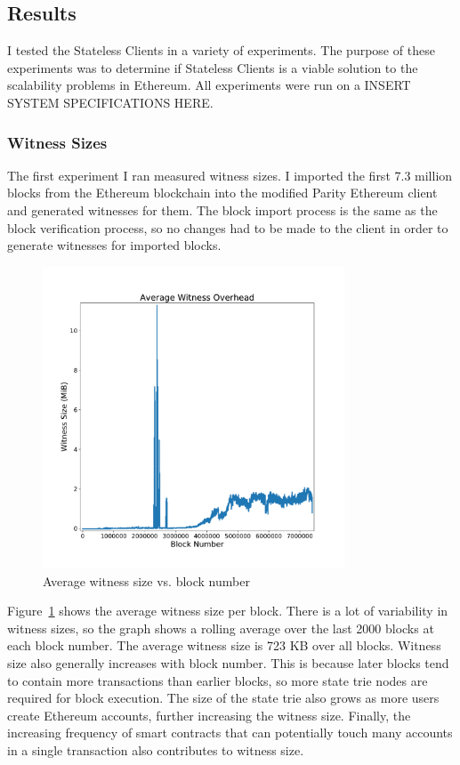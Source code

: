 \documentclass[12pt]{article}
\newcommand{\System}{Stateless Clients\xspace}
\begin{document}
\subsection{Results} \label{subsection:results}

I tested the \System in a variety of experiments. The purpose of these experiments was to determine if \System is a viable solution to the scalability problems in Ethereum. All experiments were run on a INSERT SYSTEM SPECIFICATIONS HERE.

\subsubsection{Witness Sizes}

The first experiment I ran measured witness sizes. I imported the first 7.3 million blocks from the Ethereum blockchain into the modified Parity Ethereum client and generated witnesses for them. The block import process is the same as the block verification process, so no changes had to be made to the client in order to generate witnesses for imported blocks.

\begin{figure}[H]
  \centering
  \includegraphics[width=0.8\textwidth]{../figures/results/graphs/background/witness-size.pdf}
  \caption{Average witness size vs. block number}
  \label{fig:witnesssize}
\end{figure}

Figure~\ref{fig:witnesssize} shows the average witness size per block. There is a lot of variability in witness sizes, so the graph shows a rolling average over the last 2000 blocks at each block number. The average witness size is 723 KB over all blocks. Witness size also generally increases with block number. This is because later blocks tend to contain more transactions than earlier blocks, so more state trie nodes are required for block execution. The size of the state trie also grows as more users create Ethereum accounts, further increasing the witness size. Finally, the increasing frequency of smart contracts that can potentially touch many accounts in a single transaction also contributes to witness size.
\end{document}
